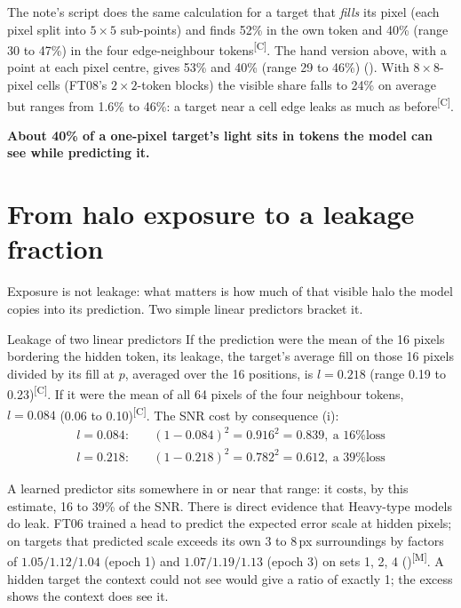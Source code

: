 \documentclass[11pt,a4paper,oneside,openany]{book}
\newcommand{\meas}{\textsuperscript{\textsf{\scriptsize[M]}}}
\newcommand{\comp}{\textsuperscript{\textsf{\scriptsize[C]}}}
\begin{document}
\begin{fromsource}
The note's script does the same calculation for a target that \emph{fills} its pixel (each pixel split into $5\times5$ sub-points) and finds 52\% in the own
token and 40\% (range 30 to 47\%) in the four edge-neighbour tokens\comp. The hand version above, with a point at each pixel centre, gives 53\% and 40\% (range 29 to
46\%) (). With $8\times8$-pixel cells (FT08's $2\times2$-token blocks) the visible share falls to 24\% on average but ranges
from 1.6\% to 46\%: a target near a cell edge leaks as much as before\comp.
\end{fromsource}

\textbf{About 40\% of a one-pixel target's light sits in tokens the model can see while predicting it.}

\section{From halo exposure to a leakage fraction}

Exposure is not leakage: what matters is how much of that visible halo the model copies into its prediction. Two simple linear predictors bracket it.

\begin{worked}[label=we:linpred]{Leakage of two linear predictors}
If the prediction were the mean of the 16 pixels bordering the hidden token, its leakage, the target's average fill on those 16 pixels divided by its fill at $p$,
averaged over the 16 positions, is $l=0.218$ (range 0.19 to 0.23)\comp. If it were the mean of all 64 pixels of the four neighbour tokens, $l=0.084$ (0.06 to
0.10)\comp. The SNR cost by consequence (i):
\begin{align*}
l=0.084: &\quad (1-0.084)^2=0.916^2=0.839,\ \text{a 16\% loss}\\
l=0.218: &\quad (1-0.218)^2=0.782^2=0.612,\ \text{a 39\% loss}
\end{align*}
\end{worked}

A learned predictor sits somewhere in or near that range: it costs, by this estimate, 16 to 39\% of the SNR. There is direct evidence that Heavy-type models do
leak. FT06 trained a head to predict the expected error scale at hidden pixels; on targets that predicted scale exceeds its own 3 to 8\,px surroundings by factors
of $1.05/1.12/1.04$ (epoch 1) and $1.07/1.19/1.13$ (epoch 3) on sets 1, 2, 4 ()\meas. A hidden target the context could not see
would give a ratio of exactly 1; the excess shows the context does see it.
\end{document}
